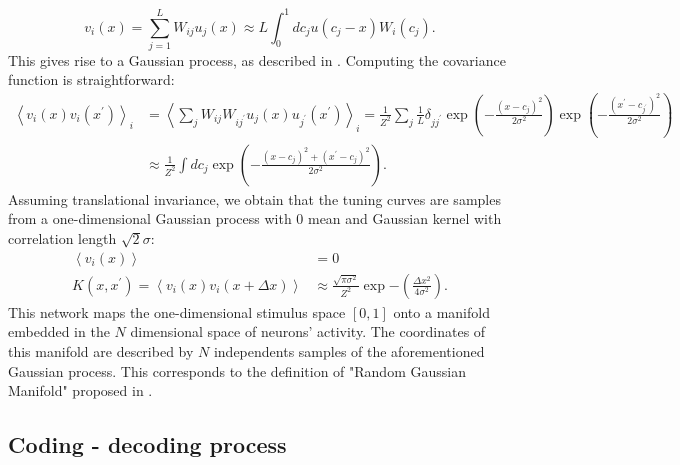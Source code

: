 \documentclass[a4paper]{article}%
\begin{document}
\[
v_{i}(x) =\sum_{j=1}^{L} W_{ij}u_{j}(x) \approx L \int_{0}^{1} dc_{j}
u(c_{j}-x) W_{i}(c_{j}).
\]
This gives rise to a Gaussian process, as described in
\cite{Higdon2002SpaceConvolutions,Rasmussen2004GaussianLearning}. Computing
the covariance function is straightforward:
\begin{equation}
\begin{split}
\left \langle v_{i}(x)v_{i}(x^{\prime}) \right\rangle_{i}  & = \left\langle \sum_{j}
W_{ij}W_{ij^{\prime}} u_{j}(x)u_{j^{\prime}}(x^{\prime}) \right\rangle_{i} =
\frac{1}{Z^{2}} \sum_{j} \frac{1}{L}\delta_{jj^{\prime}}\exp\left(-\frac
{\left(x-c_{j}\right)^{2}}{2\sigma^{2}} \right) \exp\left(-\frac{(x^{\prime}-c_{j^{\prime}
})^{2}}{2\sigma^{2}}\right)\\
& \approx\frac{1}{Z^{2} } \int dc_{j} \exp\left(-\frac{\left(x-c_{j}\right)^{2} +
\left(x^{\prime}-c_{j}\right)^{2}}{2\sigma^{2}}\right).
\end{split}
\end{equation}
Assuming translational invariance, we obtain that
the tuning curves are samples from a one-dimensional Gaussian
process with 0 mean and Gaussian kernel with correlation length $\sqrt
{2}\sigma$:
\begin{equation}
\begin{split}
\left\langle v _{i} (x )\right\rangle & =0\\
K(x,x^{\prime}) = \left\langle v_{i}(x)v_{i}(x + \Delta x )\right\rangle & \approx
\frac{\sqrt{\pi\sigma^{2}}}{Z^{2}} \exp{-\left(\frac{\Delta x^{2}}{4 \sigma^{2}}\right)}.
\label{Eq:Corr-Fun}
\end{split}
\end{equation}
This network maps the one-dimensional stimulus space $[0,1]$ onto a
 manifold embedded in the $N$ dimensional space of neurons'
activity. The coordinates of this manifold are described by $N$ independents
samples of the aforementioned Gaussian process. This corresponds to the
definition of "Random Gaussian Manifold" proposed in
\cite{Lahiri2016RandomManifolds,Gao2017AMeasurement}. \newline\newline

\subsection{Coding - decoding process}
\end{document}
